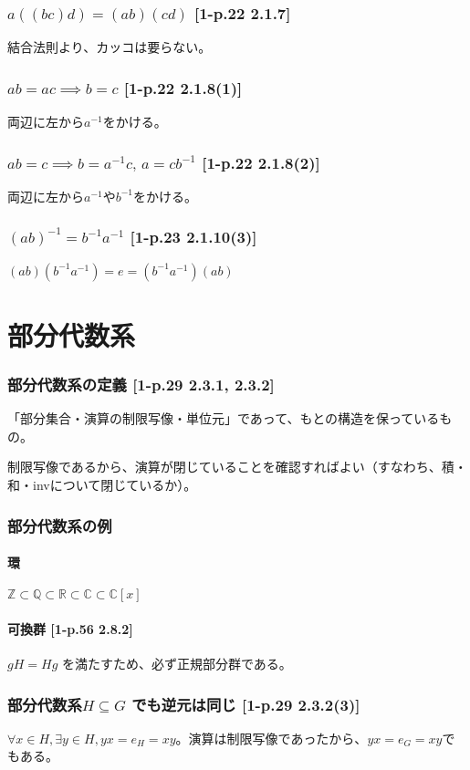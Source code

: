 \documentclass[twocolumn]{jsarticle}
\newcommand{\Z}{\mathbb{Z}}
\newcommand{\R}{\mathbb{R}}
\newcommand{\C}{\mathbb{C}}
\newcommand{\inv}[1]{#1^{-1}}
\begin{document}
\section{\(a((bc)d)=(ab)(cd)\) [1-p.22 2.1.7]}
結合法則より、カッコは要らない。
\section{\(ab=ac \implies b = c\) [1-p.22 2.1.8(1)]}
両辺に左から\(\inv{a}\)をかける。
\section{\(ab=c \implies b = \inv{a}c,\, a = c\inv{b}\) [1-p.22 2.1.8(2)]}
両辺に左から\(\inv{a}\)や\(\inv{b}\)をかける。
\section{\(\inv{(ab)}=\inv{b}\inv{a}\) [1-p.23 2.1.10(3)]}
\((ab)(\inv{b}\inv{a})=e=(\inv{b}\inv{a})(ab)\)

\part*{部分代数系}
\setcounter{section}{0}
\section{部分代数系の定義 [1-p.29 2.3.1, 2.3.2]}
「部分集合・演算の制限写像・単位元」であって、もとの構造を保っているもの。

制限写像であるから、演算が閉じていることを確認すればよい（すなわち、積・和・invについて閉じているか）。

\section{部分代数系の例}
\subsection{環}
\(\Z\subset\mathbb{Q}\subset\R\subset\C\subset\C[x]\)
\subsection{可換群 [1-p.56 2.8.2]}
\(gH=Hg\) を満たすため、必ず正規部分群である。

\section{部分代数系\(H\subseteq G\) でも逆元は同じ [1-p.29 2.3.2(3)]}
\(\forall x\in H, \exists y \in H, yx=e_H=xy\)。演算は制限写像であったから、\(yx=e_G=xy\)でもある。
\end{document}

